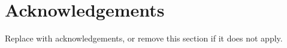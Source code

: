 \section*{Acknowledgements}
Replace with acknowledgements, or remove this section if it does not apply.
